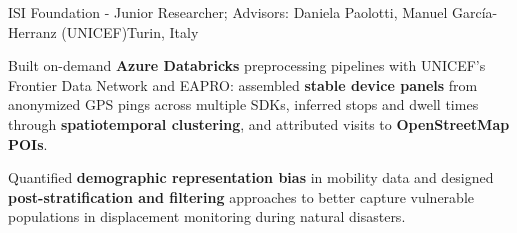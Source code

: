 \renewcommand{\timeInterval}{\DTMdisplaydate{2023}{6}{13}{-1} - \DTMdisplaydate{2024}{6}{}{}}

\ifx\lang\eng
	\begin{rCVSubsection}{ISI Foundation}{\timeInterval}{Junior Researcher; Advisors: Daniela Paolotti, Manuel Garc\'ia-Herranz (UNICEF)}{Turin, Italy}
		\item Built on-demand \textbf{Azure Databricks} preprocessing pipelines with UNICEF's Frontier Data Network and EAPRO: assembled \textbf{stable device panels} from anonymized GPS pings across multiple SDKs, inferred stops and dwell times through \textbf{spatiotemporal clustering}, and attributed visits to \textbf{OpenStreetMap POIs}.
		\item Quantified \textbf{demographic representation bias} in mobility data and designed \textbf{post-stratification and filtering} approaches to better capture vulnerable populations in displacement monitoring during natural disasters.
	\end{rCVSubsection}
\else
\fi

\renewcommand{\timeInterval}{}
